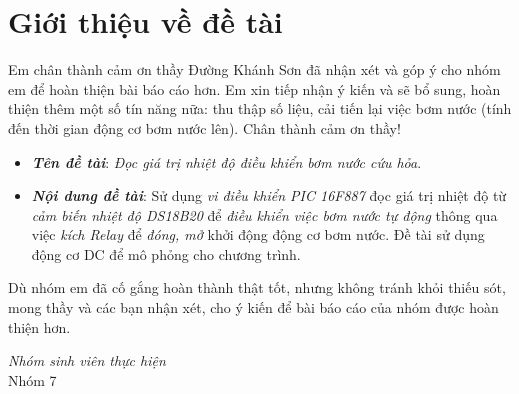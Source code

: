 \chapter*{Giới thiệu về đề tài}
Em chân thành cảm ơn thầy Đường Khánh Sơn đã nhận xét và góp ý cho nhóm em để hoàn thiện bài báo cáo hơn. Em xin tiếp nhận ý kiến và sẽ bổ sung, hoàn thiện thêm một số tín năng nữa: thu thập số liệu, cải tiến lại việc bơm nước (tính đến thời gian động cơ bơm nước lên). Chân thành cảm ơn thầy!
\begin{itemize}
\item \textbf{\textit{Tên đề tài}}: \emph{Đọc giá trị nhiệt độ điều khiển bơm nước cứu hỏa}.
\item \textbf{\textit{Nội dung đề tài}}: Sử dụng \emph{vi điều khiển PIC 16F887} đọc giá trị nhiệt độ từ \emph{cảm biến nhiệt độ DS18B20} để \emph{điều khiển việc bơm nước tự động} thông qua việc \emph{kích Relay} để \emph{đóng, mở} khởi động động cơ bơm nước. Đề tài sử dụng động cơ DC để mô phỏng cho chương trình.
\end{itemize}

Dù nhóm em đã cố gắng hoàn thành thật tốt, nhưng không tránh khỏi thiếu sót, mong thầy và các bạn nhận xét, cho ý kiến để bài báo cáo của nhóm được hoàn thiện hơn.
\begin{flushright}
\textit{Nhóm sinh viên thực hiện}\vspace{.5cm}\\
Nhóm 7
\end{flushright}